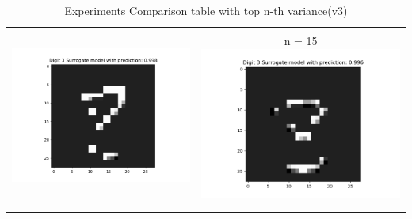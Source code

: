 \documentclass[12pt]{article}
\begin{document}
\newpage
\begin{table}[H]
    \centering
    \caption{Experiments Comparison table with top n-th variance(v3)}
    \begin{tabular}{|c|c|}
        \hline
        \begin{minipage}{0.45\linewidth}
            \centering

            n = 15 \\
            \includegraphics[width=\linewidth]{../fig/ID 3-Digit 8 pred 3 with n=15.png}
        \end{minipage} &
        \begin{minipage}{0.45\linewidth}
            \centering

            n = 15
            \includegraphics[width=\linewidth]{../fig/ID 3-Digit 8 pred 3 with n=15-1_1.png}
        \end{minipage} \\
        \\
        \hline
        \begin{minipage}{0.45\linewidth}
            \centering


\end{minipage}
\end{tabular}
\end{table}
\end{document}
